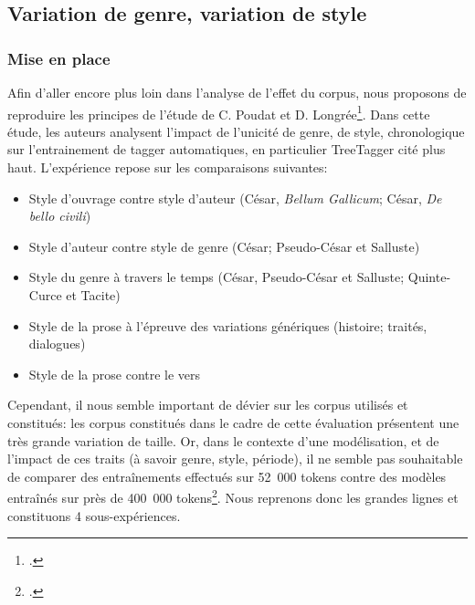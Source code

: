 \subsection{Variation de genre, variation de style}
\label{lemmatisation:extensibilite:prose-vers}

\subsubsection{Mise en place}

Afin d'aller encore plus loin dans l'analyse de l'effet du corpus, nous proposons de reproduire les principes de l'étude de C. Poudat et D. Longrée\footcite{poudat2009variations}. Dans cette étude, les auteurs analysent l'impact de l'unicité de genre, de style, chronologique sur l'entrainement de tagger automatiques, en particulier TreeTagger cité plus haut. L'expérience repose sur les comparaisons suivantes:
\begin{itemize}
    \item Style d'ouvrage contre style d'auteur (César, \textit{Bellum Gallicum}; César, \textit{De bello civili})
    \item Style d'auteur contre style de genre (César; Pseudo-César et Salluste)
    \item Style du genre à travers le temps (César, Pseudo-César et Salluste; Quinte-Curce et Tacite)
    \item Style de la prose à l'épreuve des variations génériques (histoire; traités, dialogues)
    \item Style de la prose contre le vers
\end{itemize}{}

Cependant, il nous semble important de dévier sur les corpus utilisés et constitués: les corpus constitués dans le cadre de cette évaluation présentent une très grande variation de taille. Or, dans le contexte d'une modélisation, et de l'impact de ces traits (à savoir genre, style, période), il ne semble pas souhaitable de comparer des entraînements effectués sur 52~000 tokens contre des modèles entraînés sur près de 400~000 tokens\footcite[par exemple, p.~135, 2.~2.~4]{poudat2009variations}. Nous reprenons donc les grandes lignes et constituons 4 sous-expériences.

